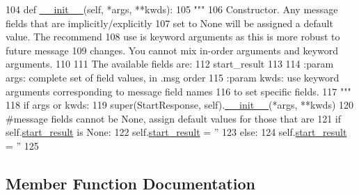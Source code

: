 \begin{DoxyCode}
104   \textcolor{keyword}{def }\hyperlink{classjaco__msgs_1_1srv_1_1__Start_1_1StartResponse_a3ff1992ef161244049f36c679d99f9b5}{\_\_init\_\_}(self, *args, **kwds):
105     \textcolor{stringliteral}{"""}
106 \textcolor{stringliteral}{    Constructor. Any message fields that are implicitly/explicitly}
107 \textcolor{stringliteral}{    set to None will be assigned a default value. The recommend}
108 \textcolor{stringliteral}{    use is keyword arguments as this is more robust to future message}
109 \textcolor{stringliteral}{    changes.  You cannot mix in-order arguments and keyword arguments.}
110 \textcolor{stringliteral}{}
111 \textcolor{stringliteral}{    The available fields are:}
112 \textcolor{stringliteral}{       start\_result}
113 \textcolor{stringliteral}{}
114 \textcolor{stringliteral}{    :param args: complete set of field values, in .msg order}
115 \textcolor{stringliteral}{    :param kwds: use keyword arguments corresponding to message field names}
116 \textcolor{stringliteral}{    to set specific fields.}
117 \textcolor{stringliteral}{    """}
118     \textcolor{keywordflow}{if} args \textcolor{keywordflow}{or} kwds:
119       super(StartResponse, self).\hyperlink{classjaco__msgs_1_1srv_1_1__Start_1_1StartResponse_a3ff1992ef161244049f36c679d99f9b5}{\_\_init\_\_}(*args, **kwds)
120       \textcolor{comment}{#message fields cannot be None, assign default values for those that are}
121       \textcolor{keywordflow}{if} self.\hyperlink{classjaco__msgs_1_1srv_1_1__Start_1_1StartResponse_a62f332f9a7e3128e9b27343abd5e715e}{start\_result} \textcolor{keywordflow}{is} \textcolor{keywordtype}{None}:
122         self.\hyperlink{classjaco__msgs_1_1srv_1_1__Start_1_1StartResponse_a62f332f9a7e3128e9b27343abd5e715e}{start\_result} = \textcolor{stringliteral}{''}
123     \textcolor{keywordflow}{else}:
124       self.\hyperlink{classjaco__msgs_1_1srv_1_1__Start_1_1StartResponse_a62f332f9a7e3128e9b27343abd5e715e}{start\_result} = \textcolor{stringliteral}{''}
125 
\end{DoxyCode}


\subsection{Member Function Documentation}
